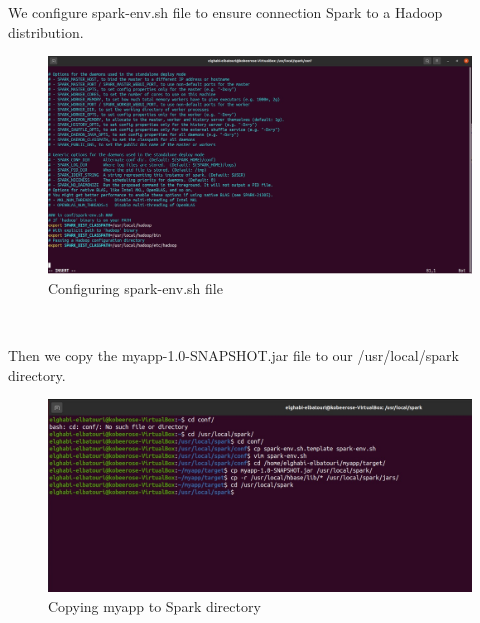 \begin{spacing}{1.2}
\par We configure spark-env.sh file to ensure connection Spark to a Hadoop distribution.
\\
\begin{figure}[!htb] 
\begin{center} 
\includegraphics[width=1\linewidth]{Pictures/HBase/Data processing with Spark/Installing and Configuring Spark-2.4.3/Configuring spark-env.sh file} 
\end{center} 
\caption{Configuring spark-env.sh file} 
\end{figure}  \FloatBarrier
\\
\newpage
\par Then we copy the myapp-1.0-SNAPSHOT.jar file to our /usr/local/spark directory.
\\
\begin{figure}[!htb] 
\begin{center} 
\includegraphics[width=1\linewidth]{Pictures/HBase/Data processing with Spark/Installing and Configuring Spark-2.4.3/Copying myapp to Spark directory} 
\end{center} 
\caption{Copying myapp to Spark directory} 
\end{figure}  \FloatBarrier
\\


\end{spacing}
